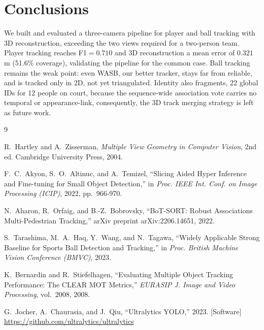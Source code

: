 \documentclass[runningheads]{llncs}
\begin{document}
\section{Conclusions}
\label{sec:conclusion}

We built and evaluated a three-camera pipeline for player and ball tracking with 3D reconstruction, exceeding the two views required for a two-person team. Player tracking reaches F1$=0.710$ and 3D reconstruction a mean error of $0.321$\,m (51.6\% coverage), validating the pipeline for the common case. Ball tracking remains the weak point: even WASB, our better tracker, stays far from reliable, and is tracked only in 2D, not yet triangulated. Identity also fragments, 22 global IDs for 12 people on court, because the sequence-wide association vote carries no temporal or appearance-link, consequently, the 3D track merging strategy is left as future work.

\footnotesize
\setlength{\itemsep}{0pt}
\setlength{\parskip}{0pt}
\begin{thebibliography}{9}

R.~Hartley and A.~Zisserman,
\emph{Multiple View Geometry in Computer Vision}, 2nd ed.
Cambridge University Press, 2004.

F.~C.~Akyon, S.~O.~Altinuc, and A.~Temizel,
``Slicing Aided Hyper Inference and Fine-tuning for Small Object
Detection,''
in \emph{Proc. IEEE Int. Conf. on Image Processing (ICIP)}, 2022,
pp.\ 966-970.

N.~Aharon, R.~Orfaig, and B.-Z.~Bobrovsky,
``BoT-SORT: Robust Associations Multi-Pedestrian Tracking,''
arXiv preprint arXiv:2206.14651, 2022.

S.~Tarashima, M.~A.~Haq, Y.~Wang, and N.~Tagawa,
``Widely Applicable Strong Baseline for Sports Ball Detection and
Tracking,''
in \emph{Proc. British Machine Vision Conference (BMVC)}, 2023.

K.~Bernardin and R.~Stiefelhagen,
``Evaluating Multiple Object Tracking Performance: The CLEAR MOT
Metrics,''
\emph{EURASIP J. Image and Video Processing}, vol.\ 2008, 2008.

G.~Jocher, A.~Chaurasia, and J.~Qiu,
    ``Ultralytics YOLO,'' 2023. [Software]
\url{https://github.com/ultralytics/ultralytics}

\end{thebibliography}
\end{document}
